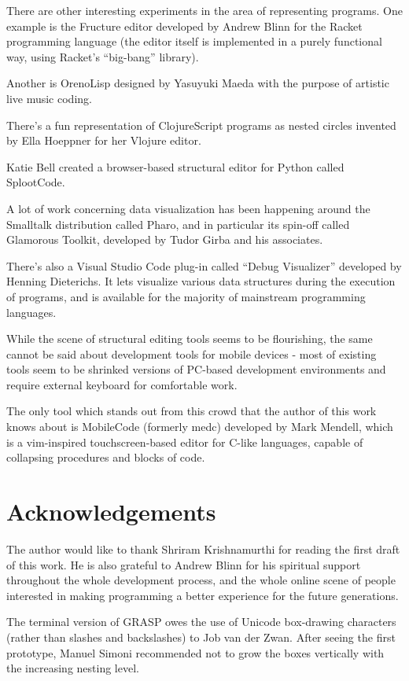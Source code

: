 \documentclass[sigconf]{acmart}
\begin{document}
There are other interesting experiments
in the area of representing programs.
One example is the Fructure editor developed
by Andrew Blinn for the Racket programming
language (the editor itself is implemented
in a purely functional way, using Racket's
``big-bang'' library)\cite{Blinn}.

Another is OrenoLisp designed by Yasuyuki
Maeda with the purpose of artistic live
music coding\cite{Maeda}.

There's a fun representation of ClojureScript
programs as nested circles invented by Ella
Hoeppner for her Vlojure editor\cite{Hoeppner}.

Katie Bell created a browser-based structural
editor for Python called SplootCode\cite{Bell}.

A lot of work concerning data visualization
has been happening around the Smalltalk
distribution called Pharo, and in particular
its spin-off called Glamorous Toolkit, developed
by Tudor Girba and his associates\cite{Girba}.

There's also a Visual Studio Code plug-in
called ``Debug Visualizer'' developed by Henning
Dieterichs\cite{Dieterichs}. It lets visualize various
data structures during the execution of programs, and is available
for the majority of mainstream programming languages.

While the scene of structural editing tools seems to
be flourishing, the same cannot be said about development
tools for mobile devices - most of existing tools seem to
be shrinked versions of PC-based development environments
and require external keyboard for comfortable work.

The only tool which stands out from this crowd
that the author of this work knows about
is MobileCode (formerly medc) developed by Mark Mendell\cite{Mendell},
which is a vim-inspired touchscreen-based editor for C-like languages,
capable of collapsing procedures and blocks of code.

\section*{Acknowledgements}

The author would like to thank Shriram Krishnamurthi for
reading the first draft of this work. He is also grateful
to Andrew Blinn for his spiritual support throughout the
whole development process, and the whole online scene
of people interested in making programming a better
experience for the future generations.

The terminal version of GRASP owes the use of Unicode
box-drawing characters (rather than slashes and backslashes)
to Job van der Zwan. After seeing the first prototype,
Manuel Simoni recommended not to grow the boxes vertically
with the increasing nesting level.
\end{document}
